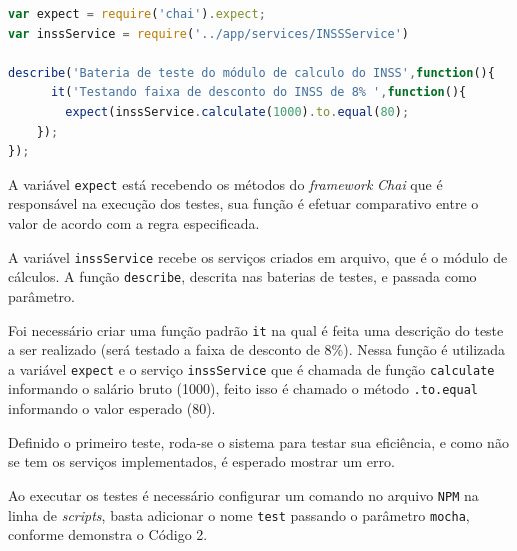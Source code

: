 \begin{lstlisting}[language=JavaScript, caption={[Teste de Código]{Teste de Código.  \textbf{Fonte:} Elaborado pelos autores.}}]
var expect = require('chai').expect;
var inssService = require('../app/services/INSSService')

describe('Bateria de teste do módulo de calculo do INSS',function(){
      it('Testando faixa de desconto do INSS de 8% ',function(){
        expect(inssService.calculate(1000).to.equal(80);
    });
});
\end{lstlisting}


\par A variável \texttt{expect} está recebendo os métodos do \textit{framework} \textit{Chai} que é responsável na execução dos testes, sua função é efetuar comparativo entre o valor de acordo com a regra especificada.

 \par A variável \texttt{inssService} recebe os serviços criados em arquivo, que é o módulo de cálculos. A função \texttt{describe}, descrita nas baterias de testes, e passada como parâmetro.
 
\par Foi necessário criar uma função padrão \texttt{it} na qual é feita uma descrição do teste a ser realizado (será testado a faixa de desconto de 8\%). Nessa função é utilizada a variável \texttt{expect} e o serviço \texttt{inssService} que é chamada de função \texttt{calculate} informando o salário bruto (1000), feito isso é chamado o método \texttt{.to.equal} informando o valor esperado (80). 

\par Definido o primeiro teste, roda-se o sistema para testar sua eficiência, e como não se tem os serviços implementados, é esperado mostrar um erro.

\par Ao executar os testes é necessário configurar um comando no arquivo \texttt{NPM} na linha de \textit{scripts}, basta adicionar o nome \texttt{test} passando o parâmetro \texttt{mocha}, conforme demonstra o Código 2.


